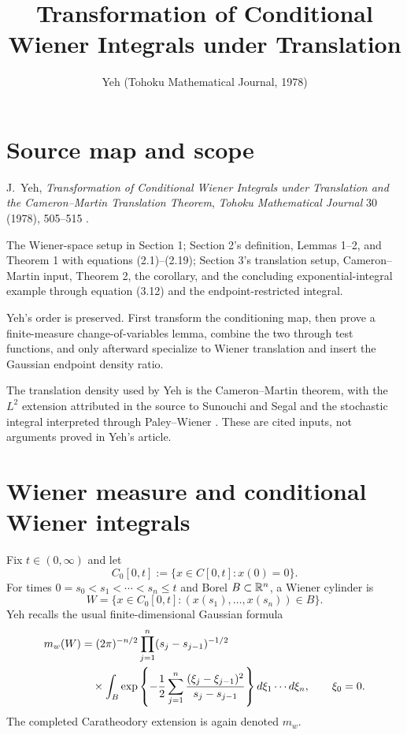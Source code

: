 
\title{Transformation of Conditional Wiener Integrals under Translation}
\author{}
\date{Yeh (Tohoku Mathematical Journal, 1978)}

\maketitle

\section*{Source map and scope}
\begin{sourceguide}
\item[Primary source] J.~Yeh, \emph{Transformation of Conditional Wiener Integrals under Translation and the Cameron--Martin Translation Theorem}, \emph{Tohoku Mathematical Journal} 30 (1978), 505--515 \cite{Yeh1978}.
\item[Coverage] The Wiener-space setup in Section 1; Section 2's definition, Lemmas 1--2, and Theorem 1 with equations (2.1)--(2.19); Section 3's translation setup, Cameron--Martin input, Theorem 2, the corollary, and the concluding exponential-integral example through equation (3.12) and the endpoint-restricted integral.
\item[Method] Yeh's order is preserved.  First transform the conditioning map, then prove a finite-measure change-of-variables lemma, combine the two through test functions, and only afterward specialize to Wiener translation and insert the Gaussian endpoint density ratio.
\item[Supplemental references] The translation density used by Yeh is the Cameron--Martin theorem, with the $L^2$ extension attributed in the source to Sunouchi and Segal and the stochastic integral interpreted through Paley--Wiener \cite{CameronMartin1944Translations,Sunouchi1951,Segal1958,PaleyWiener1934}.  These are cited inputs, not arguments proved in Yeh's article.
\end{sourceguide}

\section{Wiener measure and conditional Wiener integrals}
Fix $t\in(0,\infty)$ and let
\[
 C_0[0,t]:=\{x\in C[0,t]:x(0)=0\}.
\]
For times $0=s_0<s_1<\cdots<s_n\le t$ and Borel $B\subset\mathbb{R}^n$, a Wiener cylinder is
\[
 W=\{x\in C_0[0,t]:(x(s_1),\ldots,x(s_n))\in B\}.
\]
Yeh recalls the usual finite-dimensional Gaussian formula
\begin{align}
 m_w(W)
 &=(2\pi)^{-n/2}\prod_{j=1}^n(s_j-s_{j-1})^{-1/2}\notag\\
 &\quad\times
 \int_B
 \exp\left
 \{-\frac12\sum_{j=1}^n
 \frac{(\xi_j-\xi_{j-1})^2}{s_j-s_{j-1}}
 \right\}
 d\xi_1\cdots d\xi_n,
 \qquad \xi_0=0.\label{eq:Yeh-cylinder}
\end{align}
The completed Caratheodory extension is again denoted $m_w$.

